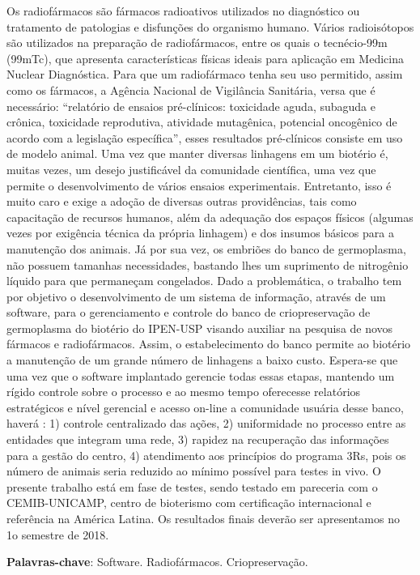 \documentclass[article,12pt,onesidea,4paper,english,brazil]{abntex2}
\begin{document}
	\noindent Os radiofármacos são fármacos radioativos utilizados no diagnóstico ou tratamento
	de patologias e disfunções do organismo humano. Vários radioisótopos são
	utilizados na preparação de radiofármacos, entre os quais o tecnécio-99m (99mTc),
	que apresenta características físicas ideais para aplicação em Medicina Nuclear
	Diagnóstica. Para que um radiofármaco tenha seu uso permitido, assim como os
	fármacos, a Agência Nacional de Vigilância Sanitária, versa que é necessário:
	“relatório de ensaios pré-clínicos: toxicidade aguda, subaguda e crônica, toxicidade
	reprodutiva, atividade mutagênica, potencial oncogênico de acordo com a legislação
	específica”, esses resultados pré-clínicos consiste em uso de modelo animal. Uma
	vez que manter diversas linhagens em um biotério é, muitas vezes, um desejo
	justificável da comunidade científica, uma vez que permite o desenvolvimento de
	vários ensaios experimentais. Entretanto, isso é muito caro e exige a adoção de
	diversas outras providências, tais como capacitação de recursos humanos, além da
	adequação dos espaços físicos (algumas vezes por exigência técnica da própria
	linhagem) e dos insumos básicos para a manutenção dos animais.
	Já por sua vez, os embriões do banco de germoplasma, não possuem tamanhas
	necessidades, bastando lhes um suprimento de nitrogênio líquido para que
	permaneçam congelados. Dado a problemática, o trabalho tem por objetivo o
	desenvolvimento de um sistema de informação, através de um software, para o
	gerenciamento e controle do banco de criopreservação de germoplasma do biotério
	do IPEN-USP visando auxiliar na pesquisa de novos fármacos e radiofármacos.
	Assim, o estabelecimento do banco permite ao biotério a manutenção de um grande
	número de linhagens a baixo custo. Espera-se que uma vez que o software
	implantado gerencie todas essas etapas, mantendo um rígido controle sobre o
	processo e ao mesmo tempo oferecesse relatórios estratégicos e nível gerencial e
	acesso on-line a comunidade usuária desse banco, haverá : 1) controle centralizado
	das ações, 2) uniformidade no processo entre as entidades que integram uma rede,
	3) rapidez na recuperação das informações para a gestão do centro, 4) atendimento
	aos princípios do programa 3Rs, pois os número de animais seria reduzido ao
	mínimo possível para testes in vivo. O presente trabalho está em fase de testes,
	sendo testado em pareceria com o CEMIB-UNICAMP, centro de bioterismo com
	certificação internacional e referência na América Latina. Os resultados finais
	deverão ser apresentamos no 1o semestre de 2018.
	
	\vspace{\onelineskip}
	
	\noindent
	\textbf{Palavras-chave}: Software. Radiofármacos. Criopreservação.
	
\end{document}
